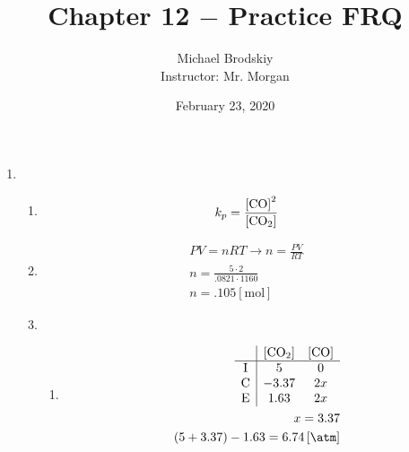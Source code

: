 \documentclass[12pt]{article}
\title{Chapter 12 $-$ Practice FRQ}
\date{February 23, 2020}
\author{Michael Brodskiy\\ \small Instructor: Mr. Morgan}
\begin{document}
\maketitle

\begin{enumerate}

  \item 

    \begin{enumerate}

      \item
        
        \begin{equation}
          \begin{split}
            k_p=\frac{\left[ \ce{CO} \right]^2}{\left[ \ce{CO2} \right]}
          \end{split}
          \label{1}
        \end{equation}

      \item

        \begin{equation}
          \begin{split}
            PV=nRT\rightarrow n=\frac{PV}{RT}\\
            n=\frac{5\cdot2}{.0821\cdot1160}\\
            n=.105\left[ \si{\mole} \right]
          \end{split}
          \label{2}
        \end{equation}

      \item

        \begin{enumerate}

          \item 

        \begin{equation}
          \begin{split}
            \begin{array}{c | c c} & [\ce{CO2}] & [\ce{CO}]\\ \hline  \text{I} & 5 & 0\\ \text{C} & -3.37 & 2x\\ \text{E} & 1.63 & 2x \end{array}\\
            x=3.37\\
            (5+3.37)-1.63=6.74\left[ \si{\atm} \right]
          \end{split}
          \label{3}
        \end{equation}


\end{enumerate}
\end{enumerate}
\end{enumerate}
\end{document}
